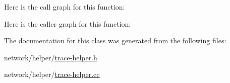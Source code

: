 Here is the call graph for this function\+:




Here is the caller graph for this function\+:




The documentation for this class was generated from the following files\+:\begin{DoxyCompactItemize}
\item 
network/helper/\hyperlink{trace-helper_8h}{trace-\/helper.\+h}\item 
network/helper/\hyperlink{trace-helper_8cc}{trace-\/helper.\+cc}\end{DoxyCompactItemize}
